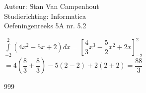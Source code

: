 \documentclass[a4paper]{article}
\begin{document}
  
\noindent \large Auteur: Stan Van Campenhout \\
\noindent \large Studierichting:  Informatica\\
\noindent \large Oefeningenreeks 5A nr. 5.2\\

\medskip

\normalsize

$ \displaystyle\int\limits_{-2}^2\left(4x^2-5x+2\right) dx = \left[\dfrac{4}{3}x^3-\dfrac{5}{2}x^2+2x\right]_{-2}^2 $\\

$ = 4\left(\dfrac{8}{3} + \dfrac{8}{3}\right)-5\left(2-2\right) + 2\left(2 + 2 \right) = \dfrac{88}{3} $\\

\begin{thebibliography}{999}
\end{thebibliography}
\end{document}
